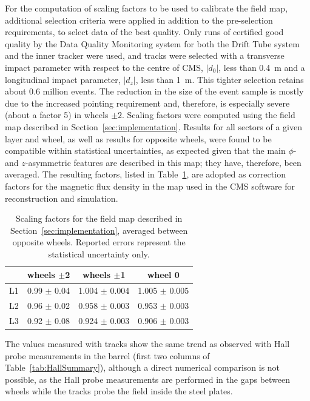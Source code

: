 For the computation of scaling factors to be used to calibrate the field
map, additional selection criteria were applied in addition to the
pre-selection requirements, to select data of the best quality. Only runs of
certified good quality by the Data Quality Monitoring system
for both the Drift Tube system and the inner tracker were used, and
tracks were selected with a transverse impact parameter with respect
to the centre of CMS, $|d_0|$, less than 0.4~m
and a longitudinal impact parameter, $|d_z|$, less than 1~m. This
tighter selection retains about 0.6 million events.
The reduction in the size of the event sample is mostly
due to the increased pointing requirement and, therefore, is
especially severe (about a factor 5) in wheels $\pm2$.
Scaling factors were computed using the field map described in
Section~\ref{sec:implementation}.
Results for all sectors of a given layer and wheel, as well as
results for opposite wheels, were found to be
compatible within statistical uncertainties, as expected given that the main
$\phi$- and $z$-asymmetric features are described in this map; they
have, therefore, been averaged.
The resulting factors, listed in Table~\ref{tab:scalingFactors}, are
adopted as correction factors for the magnetic flux density in the
map used in the CMS software for reconstruction and
simulation.
\begin{table}
\begin{center}
\caption{Scaling factors for the field map described in Section~\ref{sec:implementation}, averaged between
opposite wheels. Reported errors represent the statistical uncertainty only.
\label{tab:scalingFactors}}
\vspace{3mm}
\begin{tabular}{l|ccc}
\hline
 & wheels $\pm$2 & wheels $\pm$1 & wheel 0 \\
\hline
L1 & 0.99 $\pm$ 0.04 & 1.004 $\pm$ 0.004 & 1.005 $\pm$ 0.005 \\
L2 & 0.96 $\pm$ 0.02 & 0.958 $\pm$ 0.003 & 0.953 $\pm$ 0.003 \\
L3 & 0.92 $\pm$ 0.08 & 0.924 $\pm$ 0.003 & 0.906 $\pm$ 0.003 \\
\hline
\end{tabular}
\end{center}
\end{table}

The values measured with tracks show the same trend as observed
with Hall probe measurements in the barrel (first two columns of
Table~\ref{tab:HallSummary}), although a direct numerical comparison is not
possible, as the Hall probe measurements are performed in the gaps
between wheels
while the tracks probe the field inside the steel plates.

